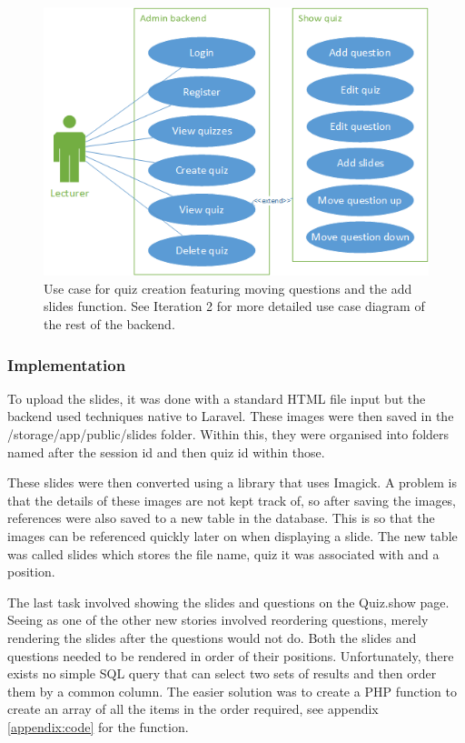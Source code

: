 \begin{figure}[H]
	\caption{Use case for quiz creation featuring moving questions and the add slides function. See Iteration 2 for more detailed use case diagram of the rest of the backend.}
	\centerline{\includegraphics{Chapter2/Iter-7/iter-7-use-case}}
	\label{fig:iter-7-use-case}
\end{figure}

\subsubsection{Implementation}
To upload the slides, it was done with a standard HTML file input but the backend used techniques native to Laravel\cite{laravel-saving-files}. These images were then saved in the /storage/app/public/slides folder. Within this, they were organised into folders named after the session id and then quiz id within those.

These slides were then converted using a library that uses Imagick\cite{spatie-pdf-converter}. A problem is that the details of these images are not kept track of, so after saving the images, references were also saved to a new table in the database. This is so that the images can be referenced quickly later on when displaying a slide. The new table was called slides which stores the file name, quiz it was associated with and a position. 

The last task involved showing the slides and questions on the Quiz.show page. Seeing as one of the other new stories involved reordering questions, merely rendering the slides after the questions would not do. Both the slides and questions needed to be rendered in order of their positions. Unfortunately, there exists no simple SQL query that can select two sets of results and then order them by a common column. The easier solution was to create a PHP function to create an array of all the items in the order required, see appendix \ref{appendix:code} for the function.
